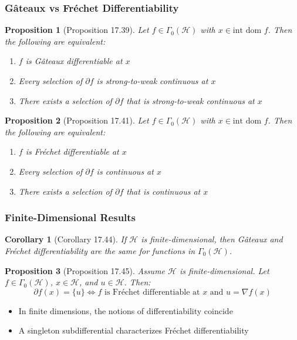 \documentclass[aspectratio=169,10pt]{beamer}
\newtheorem{prop}{Proposition}
\newtheorem{cor}{Corollary}
\begin{document}
\begin{frame}
  \frametitle{Gâteaux vs Fréchet Differentiability}

  \begin{prop}[Proposition 17.39]
    Let $f \in \Gamma_0(\mathcal{H})$ with $x \in \text{int dom } f$. Then the following are equivalent:
    \begin{enumerate}
      \item[(i)] $f$ is Gâteaux differentiable at $x$
      \item[(ii)] Every selection of $\partial f$ is strong-to-weak continuous at $x$
      \item[(iii)] There exists a selection of $\partial f$ that is strong-to-weak continuous at $x$
    \end{enumerate}
  \end{prop}

  \begin{prop}[Proposition 17.41]
    Let $f \in \Gamma_0(\mathcal{H})$ with $x \in \text{int dom } f$. Then the following are equivalent:
    \begin{enumerate}
      \item[(i)] $f$ is Fréchet differentiable at $x$
      \item[(ii)] Every selection of $\partial f$ is continuous at $x$
      \item[(iii)] There exists a selection of $\partial f$ that is continuous at $x$
    \end{enumerate}
  \end{prop}
\end{frame}

\begin{frame}
  \frametitle{Finite-Dimensional Results}

  \begin{cor}[Corollary 17.44]
    If $\mathcal{H}$ is finite-dimensional, then Gâteaux and Fréchet differentiability are the same for functions in $\Gamma_0(\mathcal{H})$.
  \end{cor}

  \begin{prop}[Proposition 17.45]
    Assume $\mathcal{H}$ is finite-dimensional. Let $f \in \Gamma_0(\mathcal{H})$, $x \in \mathcal{H}$, and $u \in \mathcal{H}$. Then:
    \[
    \partial f(x) = \{u\} \iff f \text{ is Fréchet differentiable at } x \text{ and } u = \nabla f(x)
    \]
  \end{prop}

  \begin{itemize}
    \item In finite dimensions, the notions of differentiability coincide
    \item A singleton subdifferential characterizes Fréchet differentiability
  \end{itemize}
\end{frame}
\end{document}
